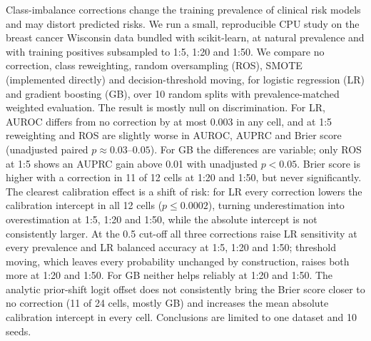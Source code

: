 Class-imbalance corrections change the training prevalence of clinical risk models and may distort predicted risks. We run a small, reproducible CPU study on the breast cancer Wisconsin data bundled with scikit-learn, at natural prevalence and with training positives subsampled to 1:5, 1:20 and 1:50. We compare no correction, class reweighting, random oversampling (ROS), SMOTE (implemented directly) and decision-threshold moving, for logistic regression (LR) and gradient boosting (GB), over 10 random splits with prevalence-matched weighted evaluation. The result is mostly null on discrimination. For LR, AUROC differs from no correction by at most 0.003 in any cell, and at 1:5 reweighting and ROS are slightly worse in AUROC, AUPRC and Brier score (unadjusted paired $p\approx0.03$--$0.05$). For GB the differences are variable; only ROS at 1:5 shows an AUPRC gain above 0.01 with unadjusted $p<0.05$. Brier score is higher with a correction in 11 of 12 cells at 1:20 and 1:50, but never significantly. The clearest calibration effect is a shift of risk: for LR every correction lowers the calibration intercept in all 12 cells ($p\le0.0002$), turning underestimation into overestimation at 1:5, 1:20 and 1:50, while the absolute intercept is not consistently larger. At the 0.5 cut-off all three corrections raise LR sensitivity at every prevalence and LR balanced accuracy at 1:5, 1:20 and 1:50; threshold moving, which leaves every probability unchanged by construction, raises both more at 1:20 and 1:50. For GB neither helps reliably at 1:20 and 1:50. The analytic prior-shift logit offset does not consistently bring the Brier score closer to no correction (11 of 24 cells, mostly GB) and increases the mean absolute calibration intercept in every cell. Conclusions are limited to one dataset and 10 seeds.
